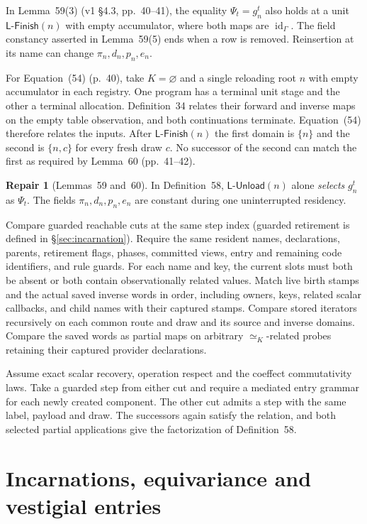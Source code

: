 \documentclass[11pt,a4paper]{article}
\theoremstyle{definition}
\newtheorem{repair}[definition]{Repair}
\theoremstyle{plain}
\newcommand{\id}{\operatorname{id}}
\newcommand{\LFinish}{\mathsf{L\text{-}Finish}}
\newcommand{\LUnload}{\mathsf{L\text{-}Unload}}
\begin{document}
In Lemma~59(3) (v1 \S4.3, pp.~40--41), the equality $\Psi_t=g_n^t$ also holds at a unit $\LFinish(n)$ with empty accumulator, where both maps are $\id_\Gamma$. The field constancy asserted in Lemma~59(5) ends when a row is removed. Reinsertion at its name can change $\pi_n,d_n,p_n,e_n$.

For Equation~(54) (p.~40), take $K=\varnothing$ and a single reloading root $n$ with empty accumulator in each registry. One program has a terminal unit stage and the other a terminal allocation. Definition~34 relates their forward and inverse maps on the empty table observation, and both continuations terminate. Equation~(54) therefore relates the inputs. After $\LFinish(n)$ the first domain is $\{n\}$ and the second is $\{n,c\}$ for every fresh draw $c$. No successor of the second can match the first as required by Lemma~60 (pp.~41--42).

\begin{repair}[Lemmas~59 and~60]
In Definition~58, $\LUnload(n)$ alone \emph{selects} $g_n^t$ as $\Psi_t$. The fields $\pi_n,d_n,p_n,e_n$ are constant during one uninterrupted residency.

Compare guarded reachable cuts at the same step index (guarded retirement is defined in \S\ref{sec:incarnation}). Require the same resident names, declarations, parents, retirement flags, phases, committed views, entry and remaining code identifiers, and rule guards. For each name and key, the current slots must both be absent or both contain observationally related values.
Match live birth stamps and the actual saved inverse words in order, including owners, keys, related scalar callbacks, and child names with their captured stamps.
Compare stored iterators recursively on each common route and draw and its source and inverse domains. Compare the saved words as partial maps on arbitrary $\simeq_K$-related probes retaining their captured provider declarations.

Assume exact scalar recovery, operation respect and the coeffect commutativity laws. Take a guarded step from either cut and require a mediated entry grammar for each newly created component. The other cut admits a step with the same label, payload and draw. The successors again satisfy the relation, and both selected partial applications give the factorization of Definition~58.
\end{repair}

\section{Incarnations, equivariance and vestigial entries}
\label{sec:identity}
\end{document}
